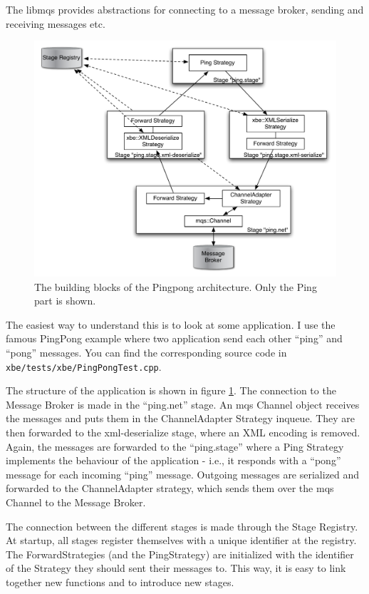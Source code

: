 \documentclass[11pt]{article}
\begin{document}
The libmqs provides abstractions for connecting to a message broker,
sending and receiving messages etc.
\begin{figure}[htbp]
  \begin{center}
    \includegraphics[width=12cm]{MQS-SEDA-Architecture.pdf}
    \caption{The building blocks of the Pingpong architecture. Only
    the Ping part is shown.}
    \label{fig:mqs-seda-architecture}
  \end{center}
\end{figure}

The easiest way to understand this is to look at some application. I
use the famous PingPong example where two application send each other
"`ping"' and "`pong"' messages. You can find the corresponding source
code in \verb|xbe/tests/xbe/PingPongTest.cpp|. 

The    structure    of    the    application   is    shown    in    figure
\ref{fig:mqs-seda-architecture}. The  connection to the  Message Broker is
made  in  the "`ping.net"'  stage.  An  mqs  Channel object  receives  the
messages and  puts them in  the ChannelAdapter Strategy inqueue.  They are
then  forwarded to  the xml-deserialize  stage, where  an XML  encoding is
removed. Again, the  messages are forwarded to the  "`ping.stage"' where a
Ping  Strategy implements  the behaviour  of  the application  - i.e.,  it
responds  with a  "`pong"'  message for  each  incoming "`ping"'  message.
Outgoing  messages  are serialized  and  forwarded  to the  ChannelAdapter
strategy, which sends them over the mqs Channel to the Message Broker.

The connection between the different stages is made through the Stage
Registry. At startup, all stages register themselves with a unique
identifier at the registry. The ForwardStrategies (and the PingStrategy)
are initialized with the identifier of the Strategy they should sent
their messages to. This way, it is easy to link together new functions
and to introduce new stages.
\end{document}
